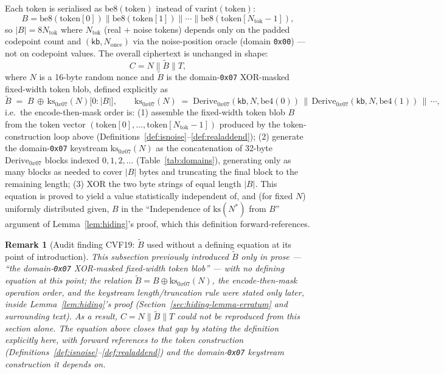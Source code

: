 \documentclass[11pt,a4paper]{article}
\newtheorem{remark}[theorem]{Remark}
\begin{document}
Each token is serialised as $\mathrm{be8}(\mathrm{token})$ instead of
$\mathrm{varint}(\mathrm{token})$:
\[
  B = \mathrm{be8}(\mathrm{token}[0]) \| \mathrm{be8}(\mathrm{token}[1]) \| \cdots \| \mathrm{be8}(\mathrm{token}[N_{\mathrm{tok}}-1]),
\]
so $\lvert B \rvert = 8N_{\mathrm{tok}}$ where $N_{\mathrm{tok}}$ (real $+$ noise tokens) depends only on
the padded codepoint count and $(\mathsf{kb}, N_{\text{once}})$ via the
noise-position oracle (domain \texttt{0x00}) --- not on codepoint values.
The overall ciphertext is unchanged in shape:
\[
  C = N \| \widetilde{B} \| T,
\]
where $N$ is a 16-byte random nonce and $\widetilde{B}$ is the
domain-\texttt{0x07} XOR-masked fixed-width token blob, defined explicitly
as
\[
  \widetilde{B} \;=\; B \,\oplus\, \mathrm{ks}_{0x07}(N)\bigl[0 : \lvert B \rvert\bigr],
  \qquad
  \mathrm{ks}_{0x07}(N) \;=\; \mathrm{Derive}_{0x07}(\mathsf{kb}, N, \mathrm{be4}(0)) \,\|\,
  \mathrm{Derive}_{0x07}(\mathsf{kb}, N, \mathrm{be4}(1)) \,\|\, \cdots,
\]
i.e.\ the encode-then-mask order is: (1) assemble the fixed-width token
blob $B$ from the token vector $(\mathrm{token}[0], \ldots,
\mathrm{token}[N_{\mathrm{tok}}-1])$ produced by the token-construction loop above
(Definitions~\ref{def:isnoise}--\ref{def:realaddend}); (2) generate the
domain-\texttt{0x07} keystream $\mathrm{ks}_{0x07}(N)$ as the
concatenation of 32-byte $\mathrm{Derive}_{0x07}$ blocks indexed
$0, 1, 2, \ldots$ (Table~\ref{tab:domains}), generating only as many
blocks as needed to cover $\lvert B \rvert$ bytes and truncating the final
block to the remaining length; (3) XOR the two byte strings of equal
length $\lvert B \rvert$. This equation is proved to yield a value
statistically independent of, and (for fixed $N$) uniformly distributed
given, $B$ in the ``Independence of $\mathrm{ks}(N^*)$ from $B$'' argument
of Lemma~\ref{lem:hiding}'s proof, which this definition forward-references.
\begin{remark}[Audit finding CVF19: $\widetilde{B}$ used without a defining equation at its point of introduction]
\label{rem:cvf19}
This subsection previously introduced $\widetilde{B}$ only in prose ---
``the domain-\texttt{0x07} XOR-masked fixed-width token blob'' --- with no
defining equation at this point; the relation
$\widetilde{B} = B \oplus \mathrm{ks}_{0x07}(N)$, the encode-then-mask
operation order, and the keystream length/truncation rule were stated
only later, inside Lemma~\ref{lem:hiding}'s proof
(Section~\ref{sec:hiding-lemma-erratum} and surrounding text). As a
result, $C = N \| \widetilde{B} \| T$ could not be reproduced from this
section alone. The equation above closes that gap by stating the
definition explicitly here, with forward references to the token
construction (Definitions~\ref{def:isnoise}--\ref{def:realaddend}) and the
domain-\texttt{0x07} keystream construction it depends on.
\end{remark}
\end{document}
